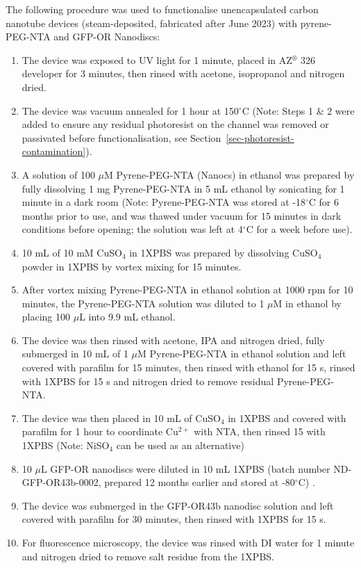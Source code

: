 \documentclass[
  a4paper,
]{scrbook}
\begin{document}
The following procedure was used to functionalise unencapsulated carbon
nanotube devices (steam-deposited, fabricated after June 2023) with
pyrene-PEG-NTA and GFP-OR Nanodiscs:

\begin{enumerate}
\def\labelenumi{\arabic{enumi}.}
\item
  The device was exposed to UV light for 1 minute, placed in
  AZ\(^\circledR\) 326 developer for 3 minutes, then rinsed with
  acetone, isopropanol and nitrogen dried.
\item
  The device was vacuum annealed for 1 hour at 150\(^\circ\)C (Note:
  Steps 1 \& 2 were added to ensure any residual photoresist on the
  channel was removed or passivated before functionalisation, see
  Section~\ref{sec-photoresist-contamination}).
\item
  A solution of 100 \(\mu\)M Pyrene-PEG-NTA (Nanocs) in ethanol was
  prepared by fully dissolving 1 mg Pyrene-PEG-NTA in 5 mL ethanol by
  sonicating for 1 minute in a dark room (Note: Pyrene-PEG-NTA was
  stored at -18\(^\circ\)C for 6 months prior to use, and was thawed
  under vacuum for 15 minutes in dark conditions before opening; the
  solution was left at 4\(^\circ\)C for a week before use).
\item
  10 mL of 10 mM CuSO\(_4\) in 1XPBS was prepared by dissolving
  CuSO\(_4\) powder in 1XPBS by vortex mixing for 15 minutes.
\item
  After vortex mixing Pyrene-PEG-NTA in ethanol solution at 1000 rpm for
  10 minutes, the Pyrene-PEG-NTA solution was diluted to 1 \(\mu\)M in
  ethanol by placing 100 \(\mu\)L into 9.9 mL ethanol.
\item
  The device was then rinsed with acetone, IPA and nitrogen dried, fully
  submerged in 10 mL of 1 \(\mu\)M Pyrene-PEG-NTA in ethanol solution
  and left covered with parafilm for 15 minutes, then rinsed with
  ethanol for 15 s, rinsed with 1XPBS for 15 s and nitrogen dried to
  remove residual Pyrene-PEG-NTA.
\item
  The device was then placed in 10 mL of CuSO\(_4\) in 1XPBS and covered
  with parafilm for 1 hour to coordinate Cu\(^{2+}\) with NTA, then
  rinsed 15 with 1XPBS (Note: NiSO\(_4\) can be used as an alternative)
\item
  10 \(\mu\)L GFP-OR nanodiscs were diluted in 10 mL 1XPBS (batch number
  ND-GFP-OR43b-0002, prepared 12 months earlier and stored at
  -80\(^\circ\)C) .
\item
  The device was submerged in the GFP-OR43b nanodisc solution and left
  covered with parafilm for 30 minutes, then rinsed with 1XPBS for 15 s.
\item
  For fluorescence microscopy, the device was rinsed with DI water for 1
  minute and nitrogen dried to remove salt residue from the 1XPBS.
\end{enumerate}
\end{document}
